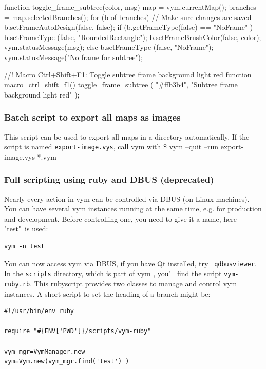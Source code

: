 \documentclass[12pt,a4paper]{article}
\newcommand{\vym}{{\sc vym }}
\newenvironment{code}[1] { \verbatim #1}{\endverbatim  }
\begin{document}
\begin{appendix}
\begin{code}
function toggle_frame_subtree(color, msg)
{
    map = vym.currentMap();
    branches = map.selectedBranches();
    for (b of branches) {
        // Make sure changes are saved
        b.setFrameAutoDesign(false, false);
        if (b.getFrameType(false) == "NoFrame" ) {
            b.setFrameType (false, "RoundedRectangle");
            b.setFrameBrushColor(false, color);
            vym.statusMessage(msg);
        } else {
            b.setFrameType (false, "NoFrame");
            vym.statusMessage("No frame for subtree");
        }
    }
}

//! Macro Ctrl+Shift+F1: Toggle subtree frame background light red
function macro_ctrl_shift_f1()
{
    toggle_frame_subtree ( "#ffb3b4", "Subtree frame background light red" );
}

\end{code}

\subsubsection{Batch script to export all maps as images}
This script can be used to export all maps in a directory
automatically. If the script is named {\tt export-image.vys}, call \vym
with
\begin{code}
\$ vym --quit --run export-image.vys *.vym
\end{code}

\subsubsection{Full scripting using ruby and DBUS (deprecated)} \label{dbus}
Nearly every action in \vym can be controlled via DBUS (on Linux
machines). You can have several \vym instances running at the same time,
e.g. for production and development. Before controlling one, you need to
give it a name, here "test"\ is used:
\begin{verbatim}
vym -n test
\end{verbatim}
You can now access \vym via DBUS, if you have Qt installed, try {\tt
qdbusviewer}. In the {\tt scripts} directory, which is part of \vym,
you'll find the script {\tt vym-ruby.rb}. This rubyscript provides two
classes to manage and control \vym instances. A short script to set the
heading of a branch might be:
\begin{verbatim}
#!/usr/bin/env ruby

require "#{ENV['PWD']}/scripts/vym-ruby"

vym_mgr=VymManager.new
vym=Vym.new(vym_mgr.find('test') )


\end{verbatim}
\end{appendix}
\end{document}
